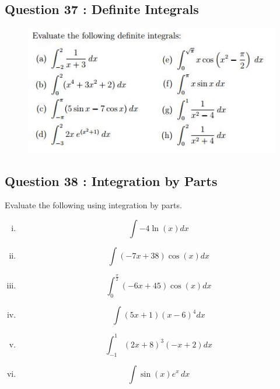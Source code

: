 \documentclass[]{article}
\begin{document}
\subsection*{Question 37 : Definite Integrals}
\begin{figure}[h!]
	\centering
	\includegraphics[width=0.8\linewidth]{Question25}
\end{figure}
\newpage
\subsection*{Question 38 : Integration by Parts}
Evaluate the following using integration by parts.

\begin{multicols}{2}
	\begin{enumerate}[(i)]
		\item \[ \int -4\ln\left(x\right)dx\]
		
		\item \[ \int\left(-7x+38\right)\cos\left(x\right)dx\]
		
		\item  \[\int_0^\frac{\pi}{2}\left(-6x+45\right)\cos\left(x\right)dx\]
		
		
		\item \[ \int\left(5x+1\right)\left(x-6\right)^4 dx\]
		
		
		\item \[ \int_{-1}^1 \left(2x+8\right)^3\left(-x+2\right)dx\]
		
		
		\item \[ \int \sin\left(x\right) e^x\, dx \] 
	\end{enumerate}
\end{multicols}
\end{document}
